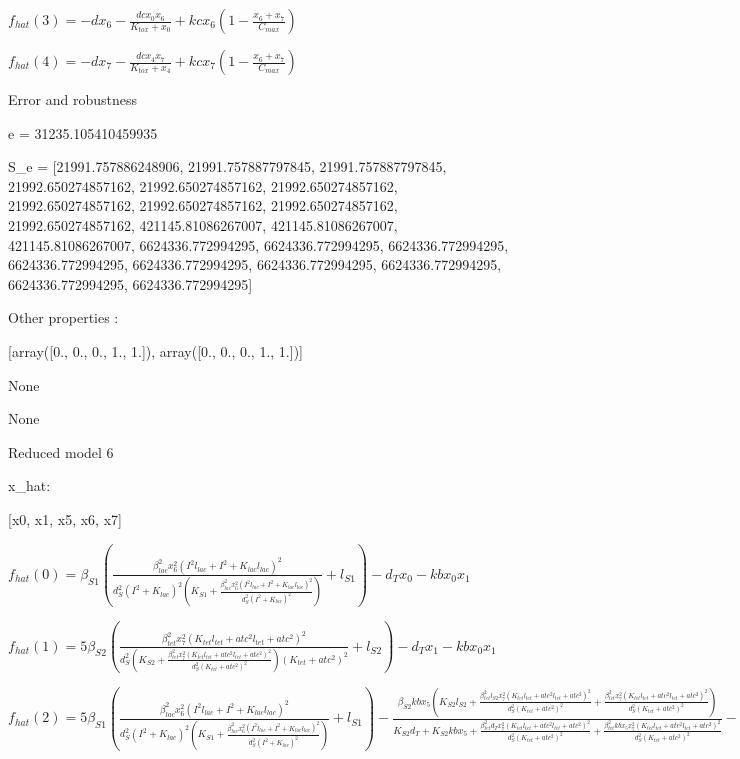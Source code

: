 $f_{hat}(3)=- d x_{6} - \frac{dc x_{0} x_{6}}{K_{tox} + x_{0}} + kc x_{6} \left(1 - \frac{x_{6} + x_{7}}{C_{max}}\right)$


$f_{hat}(4)=- d x_{7} - \frac{dc x_{4} x_{7}}{K_{tox} + x_{4}} + kc x_{7} \left(1 - \frac{x_{6} + x_{7}}{C_{max}}\right)$



Error and robustness 


e = 31235.105410459935

S_e = [21991.757886248906, 21991.757887797845, 21991.757887797845, 21992.650274857162, 21992.650274857162, 21992.650274857162, 21992.650274857162, 21992.650274857162, 21992.650274857162, 21992.650274857162, 421145.81086267007, 421145.81086267007, 421145.81086267007, 6624336.772994295, 6624336.772994295, 6624336.772994295, 6624336.772994295, 6624336.772994295, 6624336.772994295, 6624336.772994295, 6624336.772994295, 6624336.772994295]

Other properties :


[array([0., 0., 0., 1., 1.]), array([0., 0., 0., 1., 1.])]

None

None

Reduced model 6

x_{hat}: 

[x0, x1, x5, x6, x7]


$f_{hat}(0)=\beta_{S1} \left(\frac{\beta_{lac}^{2} x_{6}^{2} \left(I^{2} l_{lac} + I^{2} + K_{lac} l_{lac}\right)^{2}}{d_{S}^{2} \left(I^{2} + K_{lac}\right)^{2} \left(K_{S1} + \frac{\beta_{lac}^{2} x_{6}^{2} \left(I^{2} l_{lac} + I^{2} + K_{lac} l_{lac}\right)^{2}}{d_{S}^{2} \left(I^{2} + K_{lac}\right)^{2}}\right)} + l_{S1}\right) - d_{T} x_{0} - kb x_{0} x_{1}$


$f_{hat}(1)=5 \beta_{S2} \left(\frac{\beta_{tet}^{2} x_{7}^{2} \left(K_{tet} l_{tet} + atc^{2} l_{tet} + atc^{2}\right)^{2}}{d_{S}^{2} \left(K_{S2} + \frac{\beta_{tet}^{2} x_{7}^{2} \left(K_{tet} l_{tet} + atc^{2} l_{tet} + atc^{2}\right)^{2}}{d_{S}^{2} \left(K_{tet} + atc^{2}\right)^{2}}\right) \left(K_{tet} + atc^{2}\right)^{2}} + l_{S2}\right) - d_{T} x_{1} - kb x_{0} x_{1}$


$f_{hat}(2)=5 \beta_{S1} \left(\frac{\beta_{lac}^{2} x_{6}^{2} \left(I^{2} l_{lac} + I^{2} + K_{lac} l_{lac}\right)^{2}}{d_{S}^{2} \left(I^{2} + K_{lac}\right)^{2} \left(K_{S1} + \frac{\beta_{lac}^{2} x_{6}^{2} \left(I^{2} l_{lac} + I^{2} + K_{lac} l_{lac}\right)^{2}}{d_{S}^{2} \left(I^{2} + K_{lac}\right)^{2}}\right)} + l_{S1}\right) - \frac{\beta_{S2} kb x_{5} \left(K_{S2} l_{S2} + \frac{\beta_{tet}^{2} l_{S2} x_{7}^{2} \left(K_{tet} l_{tet} + atc^{2} l_{tet} + atc^{2}\right)^{2}}{d_{S}^{2} \left(K_{tet} + atc^{2}\right)^{2}} + \frac{\beta_{tet}^{2} x_{7}^{2} \left(K_{tet} l_{tet} + atc^{2} l_{tet} + atc^{2}\right)^{2}}{d_{S}^{2} \left(K_{tet} + atc^{2}\right)^{2}}\right)}{K_{S2} d_{T} + K_{S2} kb x_{5} + \frac{\beta_{tet}^{2} d_{T} x_{7}^{2} \left(K_{tet} l_{tet} + atc^{2} l_{tet} + atc^{2}\right)^{2}}{d_{S}^{2} \left(K_{tet} + atc^{2}\right)^{2}} + \frac{\beta_{tet}^{2} kb x_{5} x_{7}^{2} \left(K_{tet} l_{tet} + atc^{2} l_{tet} + atc^{2}\right)^{2}}{d_{S}^{2} \left(K_{tet} + atc^{2}\right)^{2}}} - d_{T} x_{5}$



